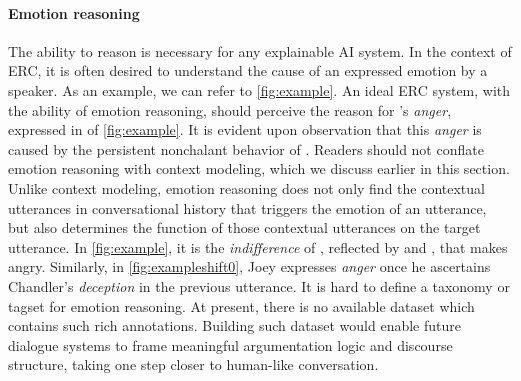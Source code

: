\documentclass{IEEEtran}\usepackage[pdftex]{graphicx}
\begin{document}
	\paragraph{Emotion reasoning}
	
	The ability to reason is necessary for any explainable AI system. In the context of ERC, it is often desired to understand the cause of an expressed emotion by a speaker. As an example, we can refer to \cref{fig:example}. An ideal ERC system, with the ability of emotion reasoning, should perceive the reason for 's \textit{anger}, expressed in  of \cref{fig:example}. It is evident upon observation that this \textit{anger} is caused by the persistent nonchalant behavior of . Readers should not conflate emotion reasoning with context modeling, which we discuss earlier in this section. Unlike context modeling, emotion reasoning does not only find the contextual utterances in conversational history that triggers the emotion of an utterance, but also determines the function of those contextual utterances on the target utterance. In \cref{fig:example}, it is the \emph{indifference} of , reflected by  and , that makes  angry. Similarly, in \cref{fig:exampleshift0}, Joey expresses \emph{anger} once he ascertains Chandler's \emph{deception} in the previous utterance. It is hard to define a taxonomy or tagset for emotion reasoning. At present, there is no available dataset which contains such rich annotations. Building such dataset would enable future dialogue systems to frame meaningful argumentation logic and discourse structure, taking one step closer to human-like conversation. 
\end{document}
